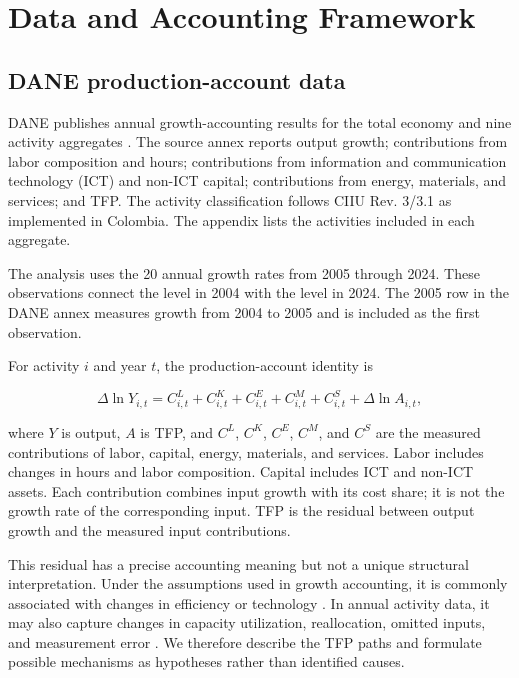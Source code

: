 \section{Data and Accounting Framework}

\subsection{DANE production-account data}

DANE publishes annual growth-accounting results for the total economy and nine activity aggregates \citep{DANE2025Annex}. The source annex reports output growth; contributions from labor composition and hours; contributions from information and communication technology (ICT) and non-ICT capital; contributions from energy, materials, and services; and TFP. The activity classification follows CIIU Rev. 3/3.1 as implemented in Colombia. The appendix lists the activities included in each aggregate.

The analysis uses the 20 annual growth rates from 2005 through 2024. These observations connect the level in 2004 with the level in 2024. The 2005 row in the DANE annex measures growth from 2004 to 2005 and is included as the first observation.

For activity \(i\) and year \(t\), the production-account identity is

\begin{equation}
\Delta \ln Y_{i,t}
=
C^{L}_{i,t}
+C^{K}_{i,t}
+C^{E}_{i,t}
+C^{M}_{i,t}
+C^{S}_{i,t}
+\Delta \ln A_{i,t},
\label{eq:production_identity}
\end{equation}

where \(Y\) is output, \(A\) is TFP, and \(C^{L}\), \(C^{K}\), \(C^{E}\), \(C^{M}\), and \(C^{S}\) are the measured contributions of labor, capital, energy, materials, and services. Labor includes changes in hours and labor composition. Capital includes ICT and non-ICT assets. Each contribution combines input growth with its cost share; it is not the growth rate of the corresponding input. TFP is the residual between output growth and the measured input contributions.

This residual has a precise accounting meaning but not a unique structural interpretation. Under the assumptions used in growth accounting, it is commonly associated with changes in efficiency or technology \citep{Solow1957,JorgensonGollopFraumeni1987}. In annual activity data, it may also capture changes in capacity utilization, reallocation, omitted inputs, and measurement error \citep{OECD2001Productivity}. We therefore describe the TFP paths and formulate possible mechanisms as hypotheses rather than identified causes.

